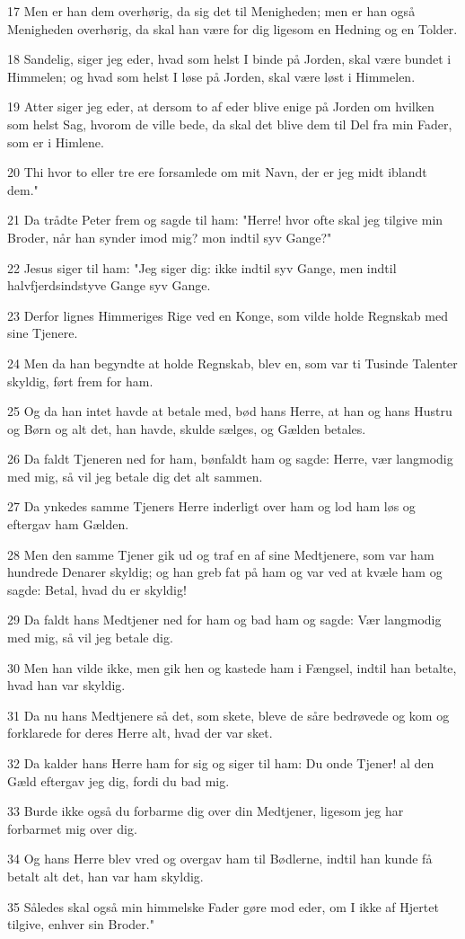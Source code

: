 \par 17 Men er han dem overhørig, da sig det til Menigheden; men er han også Menigheden overhørig, da skal han være for dig ligesom en Hedning og en Tolder.
\par 18 Sandelig, siger jeg eder, hvad som helst I binde på Jorden, skal være bundet i Himmelen; og hvad som helst I løse på Jorden, skal være løst i Himmelen.
\par 19 Atter siger jeg eder, at dersom to af eder blive enige på Jorden om hvilken som helst Sag, hvorom de ville bede, da skal det blive dem til Del fra min Fader, som er i Himlene.
\par 20 Thi hvor to eller tre ere forsamlede om mit Navn, der er jeg midt iblandt dem."
\par 21 Da trådte Peter frem og sagde til ham: "Herre! hvor ofte skal jeg tilgive min Broder, når han synder imod mig? mon indtil syv Gange?"
\par 22 Jesus siger til ham: "Jeg siger dig: ikke indtil syv Gange, men indtil halvfjerdsindstyve Gange syv Gange.
\par 23 Derfor lignes Himmeriges Rige ved en Konge, som vilde holde Regnskab med sine Tjenere.
\par 24 Men da han begyndte at holde Regnskab, blev en, som var ti Tusinde Talenter skyldig, ført frem for ham.
\par 25 Og da han intet havde at betale med, bød hans Herre, at han og hans Hustru og Børn og alt det, han havde, skulde sælges, og Gælden betales.
\par 26 Da faldt Tjeneren ned for ham, bønfaldt ham og sagde: Herre, vær langmodig med mig, så vil jeg betale dig det alt sammen.
\par 27 Da ynkedes samme Tjeners Herre inderligt over ham og lod ham løs og eftergav ham Gælden.
\par 28 Men den samme Tjener gik ud og traf en af sine Medtjenere, som var ham hundrede Denarer skyldig; og han greb fat på ham og var ved at kvæle ham og sagde: Betal, hvad du er skyldig!
\par 29 Da faldt hans Medtjener ned for ham og bad ham og sagde: Vær langmodig med mig, så vil jeg betale dig.
\par 30 Men han vilde ikke, men gik hen og kastede ham i Fængsel, indtil han betalte, hvad han var skyldig.
\par 31 Da nu hans Medtjenere så det, som skete, bleve de såre bedrøvede og kom og forklarede for deres Herre alt, hvad der var sket.
\par 32 Da kalder hans Herre ham for sig og siger til ham: Du onde Tjener! al den Gæld eftergav jeg dig, fordi du bad mig.
\par 33 Burde ikke også du forbarme dig over din Medtjener, ligesom jeg har forbarmet mig over dig.
\par 34 Og hans Herre blev vred og overgav ham til Bødlerne, indtil han kunde få betalt alt det, han var ham skyldig.
\par 35 Således skal også min himmelske Fader gøre mod eder, om I ikke af Hjertet tilgive, enhver sin Broder."

